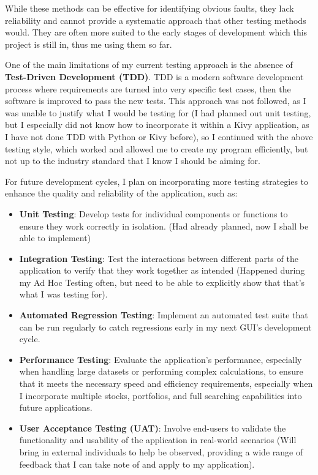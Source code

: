 \documentclass{article}
\begin{document}
While these methods can be effective for identifying obvious faults, they lack reliability and cannot provide a systematic approach that other testing methods would. They are often more suited to the early stages of development which this project is still in, thus me using them so far.\\\vspace{0.3cm}


One of the main limitations of my current testing approach is the absence of \textbf{Test-Driven Development (TDD)}. TDD is a modern software development process where requirements are turned into very specific test cases, then the software is improved to pass the new tests. This approach was not followed, as I was unable to justify what I would be testing for (I had planned out unit testing, but I especially did not know how to incorporate it within a Kivy application, as I have not done TDD with Python or Kivy before), so I continued with the above testing style, which worked and allowed me to create my program efficiently, but not up to the industry standard that I know I should be aiming for.\\\vspace{0.3cm}

\newpage
For future development cycles, I plan on incorporating more testing strategies to enhance the quality and reliability of the application, such as:

\begin{itemize}
    \item \textbf{Unit Testing}: Develop tests for individual components or functions to ensure they work correctly in isolation. (Had already planned, now I shall be able to implement)
    \item \textbf{Integration Testing}: Test the interactions between different parts of the application to verify that they work together as intended (Happened during my Ad Hoc Testing often, but need to be able to explicitly show that that's what I was testing for).
    \item \textbf{Automated Regression Testing}: Implement an automated test suite that can be run regularly to catch regressions early in my next GUI's development cycle.
    \item \textbf{Performance Testing}: Evaluate the application's performance, especially when handling large datasets or performing complex calculations, to ensure that it meets the necessary speed and efficiency requirements, especially when I incorporate multiple stocks, portfolios, and full searching capabilities into future applications.
    \item \textbf{User Acceptance Testing (UAT)}: Involve end-users to validate the functionality and usability of the application in real-world scenarios (Will bring in external individuals to help be observed, providing a wide range of feedback that I can take note of and apply to my application).
\end{itemize}
\end{document}
